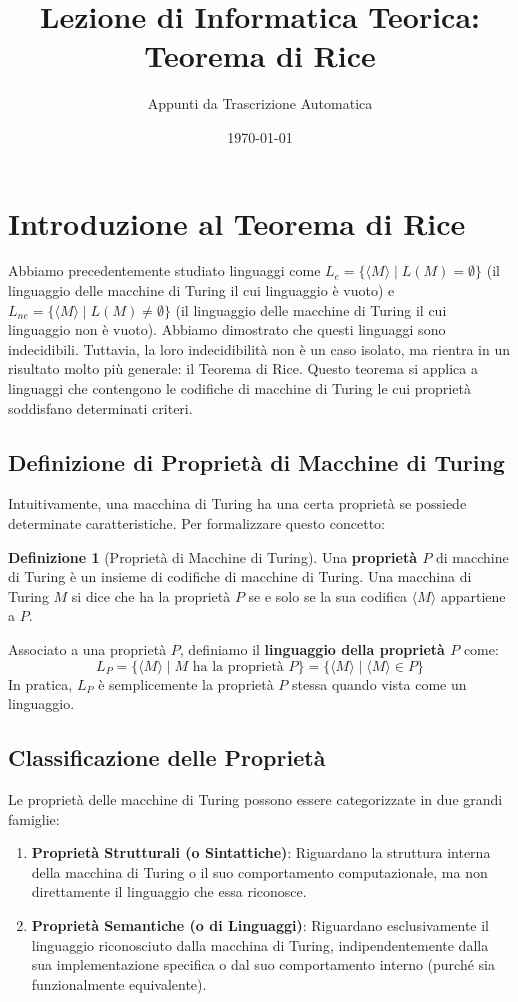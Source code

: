 \documentclass[a4paper]{article}
\title{Lezione di Informatica Teorica: Teorema di Rice}
\author{Appunti da Trascrizione Automatica}
\date{\today}
\theoremstyle{definition} %
\newtheorem{definition}{Definizione}
\begin{document}
\maketitle
\tableofcontents
\newpage

\section{Introduzione al Teorema di Rice}

Abbiamo precedentemente studiato linguaggi come $L_e = \{\langle M \rangle \mid L(M) = \emptyset\}$ (il linguaggio delle macchine di Turing il cui linguaggio è vuoto) e $L_{ne} = \{\langle M \rangle \mid L(M) \neq \emptyset\}$ (il linguaggio delle macchine di Turing il cui linguaggio non è vuoto). Abbiamo dimostrato che questi linguaggi sono indecidibili. Tuttavia, la loro indecidibilità non è un caso isolato, ma rientra in un risultato molto più generale: il Teorema di Rice. Questo teorema si applica a linguaggi che contengono le codifiche di macchine di Turing le cui proprietà soddisfano determinati criteri.

\subsection{Definizione di Proprietà di Macchine di Turing}

Intuitivamente, una macchina di Turing ha una certa proprietà se possiede determinate caratteristiche. Per formalizzare questo concetto:

\begin{definition}[Proprietà di Macchine di Turing]
Una \textbf{proprietà $P$} di macchine di Turing è un insieme di codifiche di macchine di Turing.
Una macchina di Turing $M$ si dice che ha la proprietà $P$ se e solo se la sua codifica $\langle M \rangle$ appartiene a $P$.
\end{definition}

Associato a una proprietà $P$, definiamo il \textbf{linguaggio della proprietà $P$} come:
\[ L_P = \{ \langle M \rangle \mid M \text{ ha la proprietà } P \} = \{ \langle M \rangle \mid \langle M \rangle \in P \} \]
In pratica, $L_P$ è semplicemente la proprietà $P$ stessa quando vista come un linguaggio.

\subsection{Classificazione delle Proprietà}

Le proprietà delle macchine di Turing possono essere categorizzate in due grandi famiglie:
\begin{enumerate}
    \item \textbf{Proprietà Strutturali (o Sintattiche)}: Riguardano la struttura interna della macchina di Turing o il suo comportamento computazionale, ma non direttamente il linguaggio che essa riconosce.
    \item \textbf{Proprietà Semantiche (o di Linguaggi)}: Riguardano esclusivamente il linguaggio riconosciuto dalla macchina di Turing, indipendentemente dalla sua implementazione specifica o dal suo comportamento interno (purché sia funzionalmente equivalente).
\end{enumerate}
\end{document}
